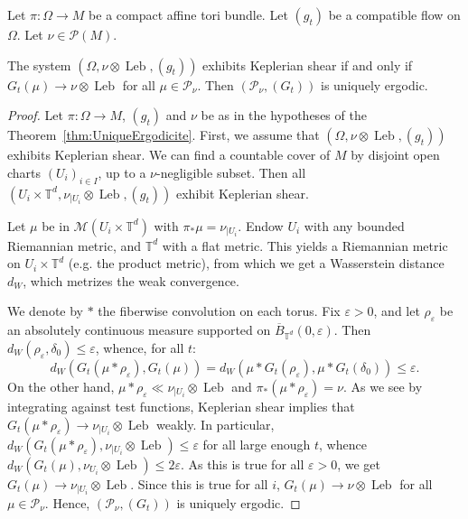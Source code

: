 \documentclass[AHL,Unicode,longabstracts]{cedram}
\DeclareMathOperator{\Leb}{Leb}
\newcommand{\Tbb}{\mathbb{T}}
\newcommand{\Mcal}{\mathcal{M}}
\newcommand{\Pcal}{\mathcal{P}}
\begin{document}
\begin{theo}\label{thm:UniqueErgodicite}

Let $\pi : \Omega \to M$ be a compact affine tori bundle. Let $(g_t)$ be a compatible flow on $\Omega$. Let $\nu \in \Pcal (M)$.


The system $(\Omega, \nu \otimes \Leb, (g_t))$ exhibits Keplerian shear if and only if $G_t (\mu) \to \nu \otimes \Leb$ for all $\mu \in \Pcal_\nu$. Then $(\Pcal_\nu, (G_t))$ is uniquely ergodic.
\end{theo}


\begin{proof}%
Let $\pi : \Omega \to M$, $(g_t)$ and $\nu$ be as in the hypotheses of the Theorem~\ref{thm:UniqueErgodicite}. First, we assume that $(\Omega, \nu \otimes \Leb, (g_t))$ exhibits Keplerian shear. We can find a countable cover of $M$ by disjoint open charts $(U_i)_{i \in I}$, up to a $\nu$-negligible subset. Then all $(U_i \times \Tbb^d, \nu_{|U_i} \otimes \Leb, (g_t))$ exhibit Keplerian shear.



Let $\mu$ be in $\Mcal (U_i \times \Tbb^d)$ with $\pi_* \mu = \nu_{|U_i}$. Endow $U_i$ with any bounded Riemannian metric, and $\Tbb^d$ with a flat metric. This yields a Riemannian metric on $U_i \times \Tbb^d$ (e.g. the product metric), from which we get a Wasserstein distance $d_W$, which metrizes the weak convergence.


We denote by $*$ the fiberwise convolution on each torus. Fix $\varepsilon >0$, and let $\rho_\varepsilon$ be an absolutely continuous measure supported on $\overline{B}_{\Tbb^d} (0, \varepsilon)$. Then $d_W (\rho_\varepsilon, \delta_0) \leq \varepsilon$, whence, for all $t$:
\[
d_W (G_t (\mu * \rho_\varepsilon), G_t (\mu)) = d_W (\mu * G_t (\rho_\varepsilon), \mu * G_t (\delta_0))
\leq \varepsilon.
\]
On the other hand, $\mu * \rho_\varepsilon \ll \nu_{|U_i} \otimes \Leb$ and $\pi_* (\mu * \rho_\varepsilon) = \nu$. As we see by integrating against test functions, Keplerian shear implies that $G_t (\mu * \rho_\varepsilon) \to \nu_{|U_i} \otimes \Leb$ weakly. In particular, $d_W (G_t (\mu * \rho_\varepsilon), \nu_{|U_i} \otimes \Leb) \leq \varepsilon$ for all large enough $t$, whence $d_W (G_t(\mu),\nu_{U_i} \otimes \Leb) \leq 2 \varepsilon$. As this is true for all $\varepsilon >0$, we get $G_t(\mu) \to \nu_{|U_i} \otimes \Leb$. Since this is true for all $i$, $G_t (\mu) \to \nu \otimes \Leb$ for all $\mu \in \Pcal_\nu$. Hence, $(\Pcal_\nu, (G_t))$ is uniquely ergodic.


\end{proof}
\end{document}
